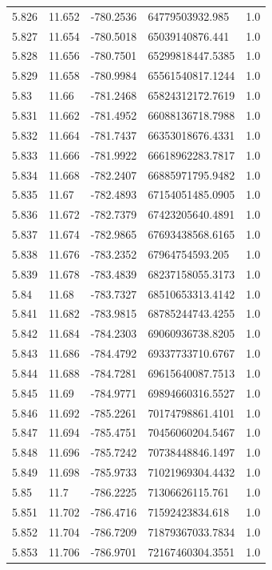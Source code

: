 \begin{tabular}{lllll}
5.826 & 11.652 & -780.2536 & 64779503932.985 & 1.0 \\
5.827 & 11.654 & -780.5018 & 65039140876.441 & 1.0 \\
5.828 & 11.656 & -780.7501 & 65299818447.5385 & 1.0 \\
5.829 & 11.658 & -780.9984 & 65561540817.1244 & 1.0 \\
5.83 & 11.66 & -781.2468 & 65824312172.7619 & 1.0 \\
5.831 & 11.662 & -781.4952 & 66088136718.7988 & 1.0 \\
5.832 & 11.664 & -781.7437 & 66353018676.4331 & 1.0 \\
5.833 & 11.666 & -781.9922 & 66618962283.7817 & 1.0 \\
5.834 & 11.668 & -782.2407 & 66885971795.9482 & 1.0 \\
5.835 & 11.67 & -782.4893 & 67154051485.0905 & 1.0 \\
5.836 & 11.672 & -782.7379 & 67423205640.4891 & 1.0 \\
5.837 & 11.674 & -782.9865 & 67693438568.6165 & 1.0 \\
5.838 & 11.676 & -783.2352 & 67964754593.205 & 1.0 \\
5.839 & 11.678 & -783.4839 & 68237158055.3173 & 1.0 \\
5.84 & 11.68 & -783.7327 & 68510653313.4142 & 1.0 \\
5.841 & 11.682 & -783.9815 & 68785244743.4255 & 1.0 \\
5.842 & 11.684 & -784.2303 & 69060936738.8205 & 1.0 \\
5.843 & 11.686 & -784.4792 & 69337733710.6767 & 1.0 \\
5.844 & 11.688 & -784.7281 & 69615640087.7513 & 1.0 \\
5.845 & 11.69 & -784.9771 & 69894660316.5527 & 1.0 \\
5.846 & 11.692 & -785.2261 & 70174798861.4101 & 1.0 \\
5.847 & 11.694 & -785.4751 & 70456060204.5467 & 1.0 \\
5.848 & 11.696 & -785.7242 & 70738448846.1497 & 1.0 \\
5.849 & 11.698 & -785.9733 & 71021969304.4432 & 1.0 \\
5.85 & 11.7 & -786.2225 & 71306626115.761 & 1.0 \\
5.851 & 11.702 & -786.4716 & 71592423834.618 & 1.0 \\
5.852 & 11.704 & -786.7209 & 71879367033.7834 & 1.0 \\
5.853 & 11.706 & -786.9701 & 72167460304.3551 & 1.0 \\

\end{tabular}
